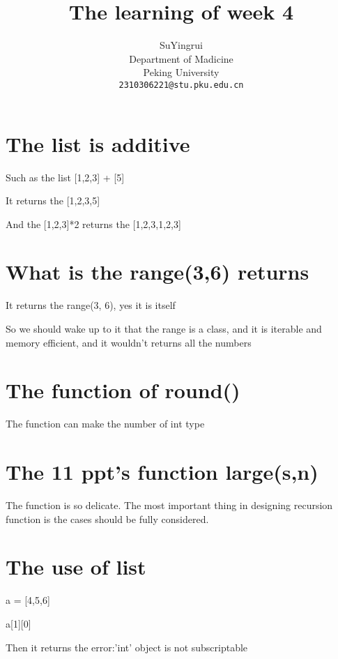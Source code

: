 \documentclass{article}
\title{The learning of week 4}
\author{%
  SuYingrui \\
  Department of Madicine\\
  Peking University\\
  \texttt{2310306221@stu.pku.edu.cn} \\
}
\begin{document}
\maketitle

\section{The list is additive}

Such as the list [1,2,3] + [5]

It returns the [1,2,3,5]

And the [1,2,3]*2  returns the [1,2,3,1,2,3]

\section{What is the range(3,6) returns}

It returns the range(3, 6), yes it is itself

So we should wake up to it that the range is a class, and it is iterable and memory efficient, and it wouldn't returns all the numbers

\section{The function of round()}

The function can make the number of int type

\section{The 11 ppt's function large(s,n)}

The function is so delicate. The most important thing in designing recursion function is the cases should be fully considered.

\section{The use of list}

a = [4,5,6]

a[1][0]

Then it returns the error:'int' object is not subscriptable
\end{document}
